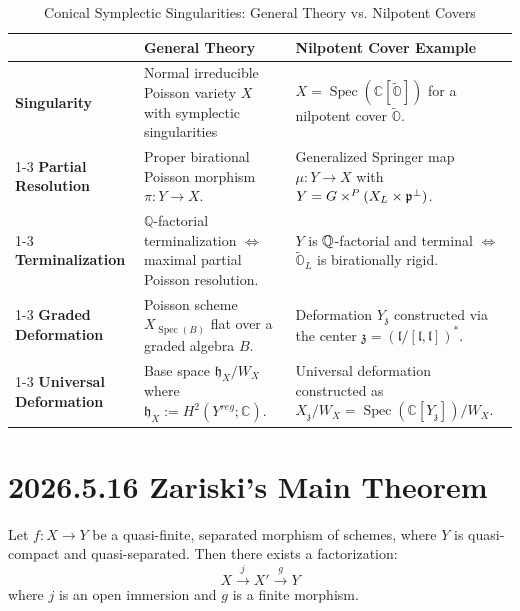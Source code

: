 \documentclass[12pt]{amsart}
\numberwithin{equation}{section}
\renewcommand{\tilde}{\widetilde}
\begin{document}
\begin{table}[htbp]
  \centering
  \caption{Conical Symplectic Singularities: General Theory vs. Nilpotent Covers}
  \begin{tabularx}{\textwidth}{@{}l >{\raggedright\arraybackslash}X >{\raggedright\arraybackslash}X @{} }
    \toprule
     & \textbf{General Theory} & \textbf{Nilpotent Cover Example} \\
    \midrule
    \textbf{Singularity} & Normal irreducible Poisson variety $X$ with symplectic singularities & $X = \operatorname{Spec}(\mathbb{C}[\tilde{\mathbb{O}}])$ for a nilpotent cover $\tilde{\mathbb{O}}$. \\
    \cmidrule(lr){1-3}
    \textbf{Partial Resolution} & Proper birational Poisson morphism $\pi: Y \to X$. & Generalized Springer map $\mu: Y \to X$ with $Y = G \times^{P} (X_L \times \mathfrak{p}^{\perp})$. \\
    \cmidrule(lr){1-3}
    \textbf{Terminalization} & $\mathbb{Q}$-factorial terminalization $\iff$ maximal partial Poisson resolution. & $Y$ is ${\mathbb {Q}}$-factorial and terminal $\iff$ $\tilde{\mathbb{O}}_L$ is birationally rigid. \\
    \cmidrule(lr){1-3}
    \textbf{Graded Deformation} & Poisson scheme $X_{\operatorname{Spec}(B)}$ flat over a graded algebra $B$. & Deformation $Y_{\mathfrak{z}}$ constructed via the center $\mathfrak{z} = (\mathfrak{l}/[\mathfrak{l}, \mathfrak{l}])^*$. \\
    \cmidrule(lr){1-3}
    \textbf{Universal Deformation} & Base space $\mathfrak{h}_X / W_X$ where $\mathfrak{h}_X := H^2(Y^{reg}; \mathbb{C})$. & Universal deformation constructed as $X_{\mathfrak{z}}/W_X = \operatorname{Spec}(\mathbb{C}[Y_{\mathfrak{z}}])/W_X$. \\
    \bottomrule
  \end{tabularx}
\end{table}

\newpage

\section{2026.5.16 Zariski's Main Theorem}

\begin{thm}
  Let $f: X \to Y$ be a quasi-finite, separated morphism of schemes, where $Y$ is quasi-compact and quasi-separated. Then there exists a factorization:$$X \xrightarrow{\ j\ } X' \xrightarrow{\ g\ } Y$$where $j$ is an open immersion and $g$ is a finite morphism.
\end{thm}
\end{document}
